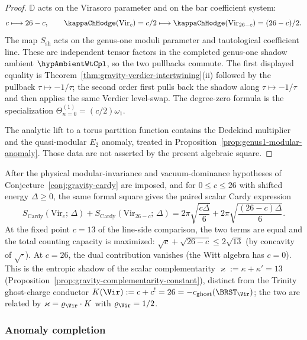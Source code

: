 \begin{proof}
\(\mathbb{D}\) acts on the Virasoro parameter and on the bar
coefficient system:
\[
c\longmapsto 26-c,\qquad
\kappaChHodge(\mathrm{Vir}_c)=c/2
\longmapsto
\kappaChHodge(\mathrm{Vir}_{26-c})=(26-c)/2 .
\]
The map \(S_{\mathrm{sh}}\) acts on the genus-one moduli parameter
and tautological coefficient line. These are independent tensor
factors in the completed genus-one shadow ambient
\(\hypAmbientWtCpl\), so the two pullbacks commute. The first
displayed equality is Theorem~\ref{thm:gravity-verdier-intertwining}(ii)
followed by the pullback \(\tau\mapsto -1/\tau\); the second order
first pulls back the shadow along \(\tau\mapsto -1/\tau\) and then
applies the same Verdier level-swap. The degree-zero formula is the
specialization \(\Theta^{(1)}_{n=0}=(c/2)\omega_1\).

The analytic lift to a torus partition function contains the
Dedekind multiplier and the quasi-modular \(E_2\) anomaly, treated in
Proposition~\ref{prop:genus1-modular-anomaly}. Those data are not
asserted by the present algebraic square.
\end{proof}

After the physical modular-invariance and vacuum-dominance hypotheses
of Conjecture~\ref{conj:gravity-cardy} are imposed, and for
\(0\le c\le 26\) with shifted energy \(\Delta\ge0\), the same formal
square gives the paired scalar Cardy expression
\[
S_{\mathrm{Cardy}}(\mathrm{Vir}_c;\,\Delta)
+ S_{\mathrm{Cardy}}(\mathrm{Vir}_{26-c};\,\Delta)
= 2\pi\sqrt{\frac{c\Delta}{6}}
 + 2\pi\sqrt{\frac{(26-c)\Delta}{6}} .
\]
At the fixed point $c = 13$ of the line-side comparison, the two terms are equal and
the total counting capacity is maximized:
$\sqrt{c} + \sqrt{26-c} \le 2\sqrt{13}$
(by concavity of $\sqrt{\cdot}$). At $c = 26$, the dual
contribution vanishes (the Witt algebra has $c = 0$).
This is the entropic shadow of the scalar complementarity
$\varkappa := \kappa + \kappa' = 13$
(Proposition~\ref{prop:gravity-complementarity-constant}), distinct
from the Trinity ghost-charge conductor
$K(\Vir) := c + c^! = 26 = -c_{\mathrm{ghost}}(\BRST_{\Vir})$; the two
are related by $\varkappa = \varrho_{\Vir}\cdot K$ with
$\varrho_{\Vir} = 1/2$.

\subsubsection*{Anomaly completion}

